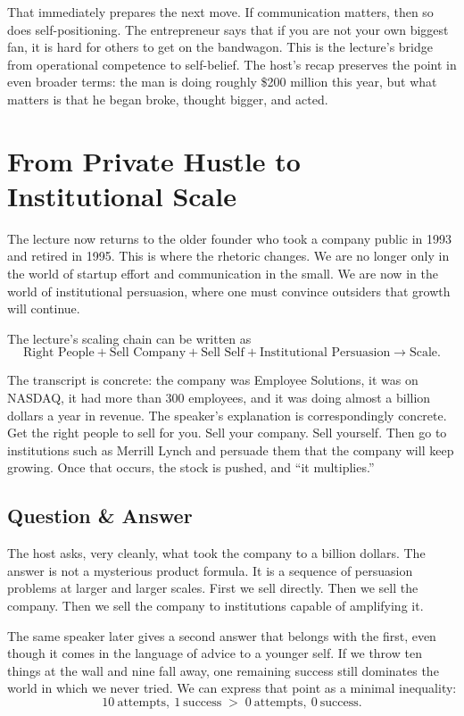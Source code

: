 That immediately prepares the next move. If communication matters, then so does self-positioning. The entrepreneur says that if you are not your own biggest fan, it is hard for others to get on the bandwagon. This is the lecture's bridge from operational competence to self-belief. The host's recap preserves the point in even broader terms: the man is doing roughly \$200 million this year, but what matters is that he began broke, thought bigger, and acted.

\section{From Private Hustle to Institutional Scale}

The lecture now returns to the older founder who took a company public in 1993 and retired in 1995. This is where the rhetoric changes. We are no longer only in the world of startup effort and communication in the small. We are now in the world of institutional persuasion, where one must convince outsiders that growth will continue.

The lecture's scaling chain can be written as
\begin{equation}
\text{Right People}+\text{Sell Company}+\text{Sell Self}+\text{Institutional Persuasion} \to \text{Scale}.
\end{equation}

The transcript is concrete: the company was Employee Solutions, it was on NASDAQ, it had more than 300 employees, and it was doing almost a billion dollars a year in revenue. The speaker's explanation is correspondingly concrete. Get the right people to sell for you. Sell your company. Sell yourself. Then go to institutions such as Merrill Lynch and persuade them that the company will keep growing. Once that occurs, the stock is pushed, and ``it multiplies.''

\subsection{Question \& Answer}

The host asks, very cleanly, what took the company to a billion dollars. The answer is not a mysterious product formula. It is a sequence of persuasion problems at larger and larger scales. First we sell directly. Then we sell the company. Then we sell the company to institutions capable of amplifying it.

The same speaker later gives a second answer that belongs with the first, even though it comes in the language of advice to a younger self. If we throw ten things at the wall and nine fall away, one remaining success still dominates the world in which we never tried. We can express that point as a minimal inequality:
\begin{equation}
10\ \text{attempts},\ 1\ \text{success} \;>\; 0\ \text{attempts},\ 0\ \text{success}.
\end{equation}


